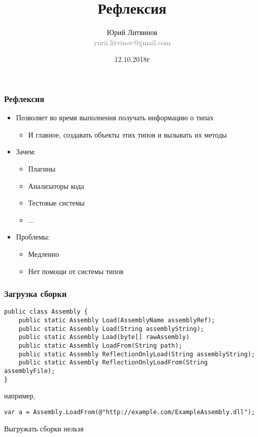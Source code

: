 \documentclass[xetex,mathserif,serif]{beamer}
\title{Рефлексия}
\author[Юрий Литвинов]{Юрий Литвинов\\\small{\textcolor{gray}{yurii.litvinov@gmail.com}}}
\date{12.10.2018г}
\begin{document}
	\frame{\titlepage}

	\begin{frame}
		\frametitle{Рефлексия}
		\begin{itemize}
			\item Позволяет во время выполнения получать информацию о типах
			\begin{itemize}
				\item И главное, создавать объекты этих типов и вызывать их методы
			\end{itemize}
			\item Зачем:
			\begin{itemize}
				\item Плагины
				\item Анализаторы кода
				\item Тестовые системы
				\item ...
			\end{itemize}
			\item Проблемы:
			\begin{itemize}
				\item Медленно
				\item Нет помощи от системы типов
			\end{itemize}
		\end{itemize}
	\end{frame}

	\begin{frame}[fragile]
		\frametitle{Загрузка сборки}
		\begin{small}
			\begin{verbatim}
public class Assembly {
    public static Assembly Load(AssemblyName assemblyRef);
    public static Assembly Load(String assemblyString);
    public static Assembly Load(byte[] rawAssembly)
    public static Assembly LoadFrom(String path);
    public static Assembly ReflectionOnlyLoad(String assemblyString);
    public static Assembly ReflectionOnlyLoadFrom(String assemblyFile);
}
			\end{verbatim}
			например,
			\begin{verbatim}
var a = Assembly.LoadFrom(@"http://example.com/ExampleAssembly.dll");
			\end{verbatim}
			Выгружать сборки нельзя
		\end{small}
	\end{frame}
\end{document}
